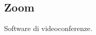 \documentclass[../glossario.tex]{subfiles}
\begin{document}
\subsection*{Zoom} 
Software di videoconferenze.


    
\end{document}
